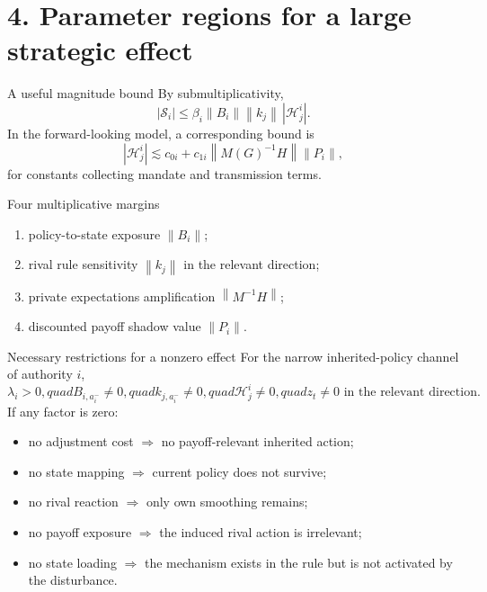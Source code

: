 \documentclass[10pt,aspectratio=169]{beamer}
\newcommand{\norm}[1]{\left\lVert#1\right\rVert}
\begin{document}
\section{4. Parameter regions for a large strategic effect}

\begin{frame}{A useful magnitude bound}
By submultiplicativity,
\begin{equation*}
|\mathcal S_i|
\le
\beta_i\norm{B_i}\norm{k_j}\,|\mathcal H^i_j|.
\end{equation*}
In the forward-looking model, a corresponding bound is
\begin{equation*}
|\mathcal H^i_j|
\lesssim
c_{0i}+c_{1i}\norm{M(G)^{-1}H}\norm{P_i},
\end{equation*}
for constants collecting mandate and transmission terms.
\begin{block}{Four multiplicative margins}
\begin{enumerate}
  \item policy-to-state exposure $\norm{B_i}$;
  \item rival rule sensitivity $\norm{k_j}$ in the relevant direction;
  \item private expectations amplification $\norm{M^{-1}H}$;
  \item discounted payoff shadow value $\norm{P_i}$.
\end{enumerate}
\end{block}
\end{frame}

\begin{frame}{Necessary restrictions for a nonzero effect}
For the narrow inherited-policy channel of authority $i$,
\begin{equation*}
\boxed{
\lambda_i>0,quad
B_{i,a_i^-}\ne0,quad
k_{j,a_i^-}\ne0,quad
\mathcal H^i_j\ne0,quad
z_t\ne0\text{ in the relevant direction}.}
\end{equation*}
If any factor is zero:
\begin{itemize}
  \item no adjustment cost $\Rightarrow$ no payoff-relevant inherited action;
  \item no state mapping $\Rightarrow$ current policy does not survive;
  \item no rival reaction $\Rightarrow$ only own smoothing remains;
  \item no payoff exposure $\Rightarrow$ the induced rival action is irrelevant;
  \item no state loading $\Rightarrow$ the mechanism exists in the rule but is
        not activated by the disturbance.
\end{itemize}
\end{frame}
\end{document}
